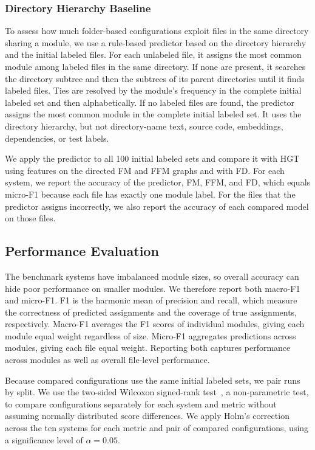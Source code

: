 \subsubsection{Directory Hierarchy Baseline\label{sec:dir_predictor}}
To assess how much folder-based configurations exploit files in the same directory sharing a module, we use a rule-based predictor based on the directory hierarchy and the initial labeled files. For each unlabeled file, it assigns the most common module among labeled files in the same directory. If none are present, it searches the directory subtree and then the subtrees of its parent directories until it finds labeled files. Ties are resolved by the module's frequency in the complete initial labeled set and then alphabetically. If no labeled files are found, the predictor assigns the most common module in the complete initial labeled set. It uses the directory hierarchy, but not directory-name text, source code, embeddings, dependencies, or test labels.
 
We apply the predictor to all 100 initial labeled sets and compare it with HGT using \ft{} features on the directed FM and FFM graphs and with FD. For each system, we report the accuracy of the predictor, FM, FFM, and FD, which equals micro-F1 because each file has exactly one module label. For the files that the predictor assigns incorrectly, we also report the accuracy of each compared model on those files.

\subsection{Performance Evaluation}
The benchmark systems have imbalanced module sizes, so overall accuracy can hide poor performance on smaller modules. We therefore report both macro-F1 and micro-F1. F1 is the harmonic mean of precision and recall, which measure the correctness of predicted assignments and the coverage of true assignments, respectively. Macro-F1 averages the F1 scores of individual modules, giving each module equal weight regardless of size. Micro-F1 aggregates predictions across modules, giving each file equal weight. Reporting both captures performance across modules as well as overall file-level performance.

Because compared configurations use the same initial labeled sets, we pair runs by split. We use the two-sided Wilcoxon signed-rank test~\cite{wilcoxon}, a non-parametric test, to compare configurations separately for each system and metric without assuming normally distributed score differences. We apply Holm's correction across the ten systems for each metric and pair of compared configurations, using a significance level of $\alpha=0.05$. 

